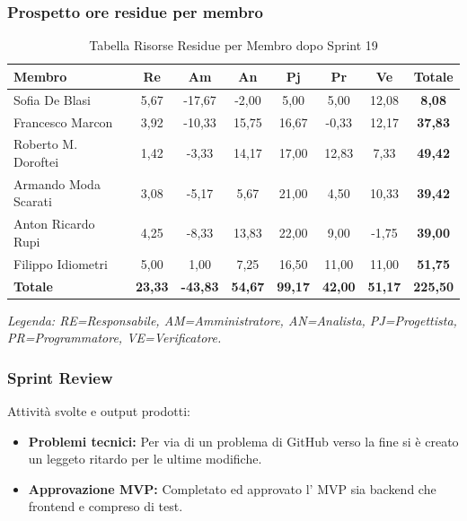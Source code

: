 \subsubsection{Prospetto ore residue per membro}
\begin{table}[H]
    \centering
    \renewcommand{\arraystretch}{1.3}
    \begin{tabularx}{\textwidth}{|X|c|c|c|c|c|c|c|}
        \hline
        \textbf{Membro} & \textbf{Re} & \textbf{Am} & \textbf{An} &
        \textbf{Pj} & \textbf{Pr} & \textbf{Ve} & \textbf{Totale} \\
        \hline
        Sofia De Blasi       &  5,67 & -17,67 &  -2,00 &  5,00 & 5,00 & 12,08 & \textbf{8,08} \\
        Francesco Marcon     &  3,92 & -10,33 &  15,75 & 16,67 & -0,33 & 12,17 & \textbf{37,83} \\
        Roberto M. Doroftei  &  1,42 &  -3,33 &  14,17 & 17,00 & 12,83 &  7,33 & \textbf{49,42} \\
        Armando Moda Scarati &  3,08 &  -5,17 &   5,67 & 21,00 &  4,50 & 10,33 & \textbf{39,42} \\
        Anton Ricardo Rupi   &  4,25 &  -8,33 &  13,83 & 22,00 &  9,00 & -1,75 & \textbf{39,00} \\
        Filippo Idiometri    &  5,00 &   1,00 &   7,25 & 16,50 & 11,00 & 11,00 & \textbf{51,75} \\
        \hline
        \textbf{Totale} &
        \textbf{23,33} & \textbf{-43,83} & \textbf{54,67} &
        \textbf{99,17} & \textbf{42,00} & \textbf{51,17} &
        \textbf{225,50} \\
        \hline
    \end{tabularx}
    \begin{minipage}{\textwidth}
        \smallskip
        \footnotesize\textit{Legenda: RE=Responsabile, AM=Amministratore,
        AN=Analista, PJ=Progettista, PR=Programmatore, VE=Verificatore.}
    \end{minipage}
    \caption{Tabella Risorse Residue per Membro dopo Sprint 19}
\end{table}

\subsubsection{Sprint Review}
Attività svolte e output prodotti:
\begin{itemize}
    \item \textbf{Problemi tecnici:} Per via di un problema di GitHub verso la fine si è creato un leggeto ritardo per le ultime modifiche.
    \item \textbf{Approvazione MVP:} Completato ed approvato l' MVP sia backend che frontend e compreso di test.
\end{itemize}

